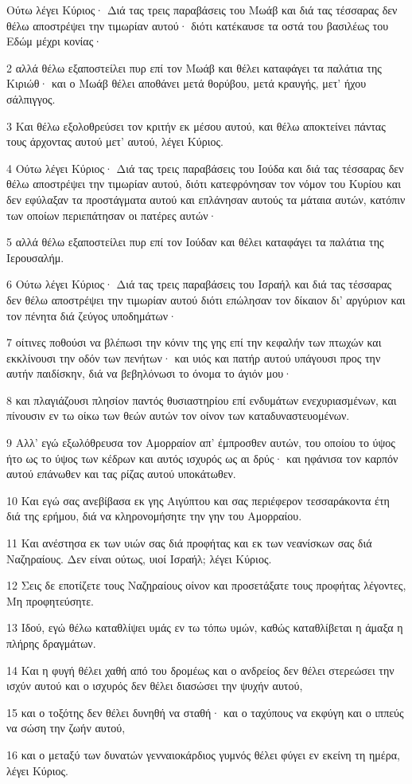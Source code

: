 \par Ούτω λέγει Κύριος· Διά τας τρεις παραβάσεις του Μωάβ και διά τας τέσσαρας δεν θέλω αποστρέψει την τιμωρίαν αυτού· διότι κατέκαυσε τα οστά του βασιλέως του Εδώμ μέχρι κονίας·
\par 2 αλλά θέλω εξαποστείλει πυρ επί τον Μωάβ και θέλει καταφάγει τα παλάτια της Κιριώθ· και ο Μωάβ θέλει αποθάνει μετά θορύβου, μετά κραυγής, μετ' ήχου σάλπιγγος.
\par 3 Και θέλω εξολοθρεύσει τον κριτήν εκ μέσου αυτού, και θέλω αποκτείνει πάντας τους άρχοντας αυτού μετ' αυτού, λέγει Κύριος.
\par 4 Ούτω λέγει Κύριος· Διά τας τρεις παραβάσεις του Ιούδα και διά τας τέσσαρας δεν θέλω αποστρέψει την τιμωρίαν αυτού, διότι κατεφρόνησαν τον νόμον του Κυρίου και δεν εφύλαξαν τα προστάγματα αυτού και επλάνησαν αυτούς τα μάταια αυτών, κατόπιν των οποίων περιεπάτησαν οι πατέρες αυτών·
\par 5 αλλά θέλω εξαποστείλει πυρ επί τον Ιούδαν και θέλει καταφάγει τα παλάτια της Ιερουσαλήμ.
\par 6 Ούτω λέγει Κύριος· Διά τας τρεις παραβάσεις του Ισραήλ και διά τας τέσσαρας δεν θέλω αποστρέψει την τιμωρίαν αυτού διότι επώλησαν τον δίκαιον δι' αργύριον και τον πένητα διά ζεύγος υποδημάτων·
\par 7 οίτινες ποθούσι να βλέπωσι την κόνιν της γης επί την κεφαλήν των πτωχών και εκκλίνουσι την οδόν των πενήτων· και υιός και πατήρ αυτού υπάγουσι προς την αυτήν παιδίσκην, διά να βεβηλόνωσι το όνομα το άγιόν μου·
\par 8 και πλαγιάζουσι πλησίον παντός θυσιαστηρίου επί ενδυμάτων ενεχυριασμένων, και πίνουσιν εν τω οίκω των θεών αυτών τον οίνον των καταδυναστευομένων.
\par 9 Αλλ' εγώ εξωλόθρευσα τον Αμορραίον απ' έμπροσθεν αυτών, του οποίου το ύψος ήτο ως το ύψος των κέδρων και αυτός ισχυρός ως αι δρύς· και ηφάνισα τον καρπόν αυτού επάνωθεν και τας ρίζας αυτού υποκάτωθεν.
\par 10 Και εγώ σας ανεβίβασα εκ γης Αιγύπτου και σας περιέφερον τεσσαράκοντα έτη διά της ερήμου, διά να κληρονομήσητε την γην του Αμορραίου.
\par 11 Και ανέστησα εκ των υιών σας διά προφήτας και εκ των νεανίσκων σας διά Ναζηραίους. Δεν είναι ούτως, υιοί Ισραήλ; λέγει Κύριος.
\par 12 Σεις δε εποτίζετε τους Ναζηραίους οίνον και προσετάξατε τους προφήτας λέγοντες, Μη προφητεύσητε.
\par 13 Ιδού, εγώ θέλω καταθλίψει υμάς εν τω τόπω υμών, καθώς καταθλίβεται η άμαξα η πλήρης δραγμάτων.
\par 14 Και η φυγή θέλει χαθή από του δρομέως και ο ανδρείος δεν θέλει στερεώσει την ισχύν αυτού και ο ισχυρός δεν θέλει διασώσει την ψυχήν αυτού,
\par 15 και ο τοξότης δεν θέλει δυνηθή να σταθή· και ο ταχύπους να εκφύγη και ο ιππεύς να σώση την ζωήν αυτού,
\par 16 και ο μεταξύ των δυνατών γενναιοκάρδιος γυμνός θέλει φύγει εν εκείνη τη ημέρα, λέγει Κύριος.


